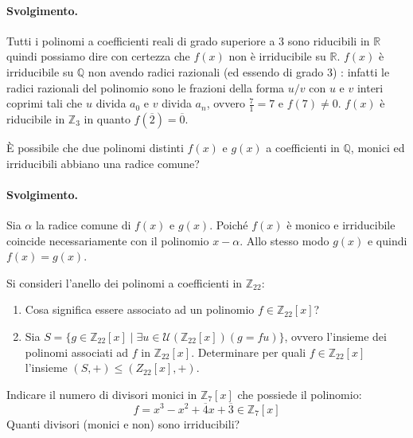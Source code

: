 \paragraph{Svolgimento.} Tutti i polinomi a coefficienti reali di grado superiore a 3 sono riducibili in $\mathbb{R}$ quindi possiamo dire con certezza che $f(x)$ non è irriducibile su $\mathbb{R}$. $f(x)$ è irriducibile su $\mathbb{Q}$ non avendo radici razionali (ed essendo di grado 3) : infatti le radici razionali del polinomio sono le frazioni della forma $u/v$ con $u$ e $v$ interi coprimi tali che $u$ divida $a_{0}$ e $v$ divida $a_{n}$, ovvero $\frac{7}{1} = 7$ e $f(7) \neq 0$. $f(x)$ è riducibile in $\mathbb{Z}_{3}$ in quanto $f(\overline{2}) = \overline{0}$. \hfill \blacksquare
\begin{exsbox}
	È possibile che due polinomi distinti $f(x)$ e $g(x)$ a coefficienti in $\mathbb{Q}$, monici ed irriducibili abbiano una radice comune?
\end{exsbox}
\paragraph{Svolgimento.} Sia $\alpha$ la radice comune di $f(x)$ e $g(x)$. Poiché $f(x)$ è monico e irriducibile coincide necessariamente con il polinomio $x-\alpha$. Allo stesso modo $g(x)$ e quindi $f(x)=g(x)$. \hfill \blacksquare

\begin{exsbox}
	Si consideri l'anello dei polinomi a coefficienti in $\mathbb{Z}_{22}$:
	\begin{enumerate}
		\item Cosa significa essere associato ad un polinomio $f \in \mathbb{Z}_{22}[x]$?
		\item Sia $S=\{g \in \mathbb{Z}_{22}[x] \; | \; \exists u \in \mathcal{U}(\mathbb{Z}_{22}[x])(g=fu)\}$, ovvero l'insieme dei polinomi associati ad $f$ in $\mathbb{Z}_{22}[x]$. Determinare per quali $f \in \mathbb{Z}_{22}[x]$ l'insieme $(S,+) \leq (Z_{22}[x],+)$.
	\end{enumerate}
	
\end{exsbox}

\begin{exsbox}
	Indicare il numero di divisori monici in $\mathbb{Z}_{7}[x]$  che possiede il polinomio:
	\begin{displaymath}
		f = x^{3} - x^{2} + \overline{4}x + \overline{3} \in \mathbb{Z}_{7}[x]
	\end{displaymath}
	Quanti divisori (monici e non) sono irriducibili?
\end{exsbox}

